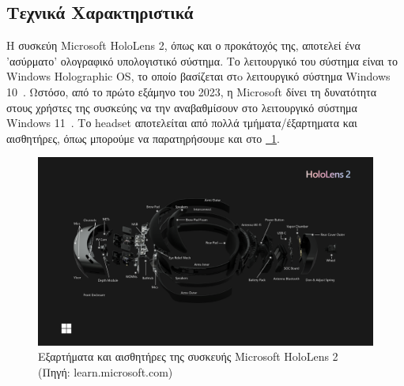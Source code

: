 \subsection{Τεχνικά Χαρακτηριστικά}\label{subsec:hololensSpecs}
Η συσκεύη Microsoft HoloLens 2, όπως και ο προκάτοχός της, αποτελεί ένα 'ασύρματο' ολογραφικό υπολογιστικό σύστημα. Το λειτουργικό του σύστημα είναι το Windows Holographic OS, το οποίο βασίζεται στo λειτουργικό σύστημα Windows 10~\cite{scooley_2023_hololens}. Ωστόσο, από το πρώτο εξάμηνο του 2023, η Microsoft δίνει τη δυνατότητα στους χρήστες της συσκεύης να την αναβαθμίσουν στο λειτουργικό σύστημα Windows 11~\cite{seiler_2023_microsoft}. Το headset αποτελείται από πολλά τμήματα/έξαρτηματα και αισθητήρες, όπως μπορούμε να παρατηρήσουμε και στο \hyperref[fig:hololensDeviceParts]{\schema~\ref*{fig:hololensDeviceParts}}.
\begin{figure}[!ht]
    \centering
    \includegraphics[width=130mm]{images/microsoft_hololens_2_parts2.png}
    \caption{Εξαρτήματα και αισθητήρες της συσκευής Microsoft HoloLens 2 {\footnotesize (Πηγή: learn.microsoft.com)}}\label{fig:hololensDeviceParts}
\end{figure}


